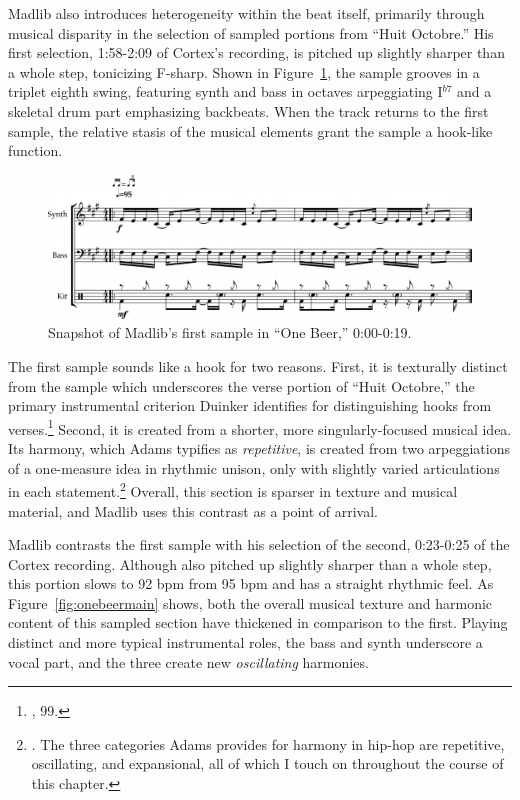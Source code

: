 Madlib also introduces heterogeneity within the beat itself, primarily through musical disparity in the selection of sampled portions from ``Huit Octobre.'' His first selection, 1:58-2:09 of Cortex's recording, is pitched up slightly sharper than a whole step, tonicizing F-sharp. Shown in Figure~\ref{fig:onebeerintro}, the sample grooves in a triplet eighth swing, featuring synth and bass in octaves arpeggiating I$^{b7}$ and a skeletal drum part emphasizing backbeats. When the track returns to the first sample, the relative stasis of the musical elements grant the sample a hook-like function.

    \begin{figure}[ht]
        \centering
        \includegraphics[width=\textwidth]{images/figures/chp 02/000019onebeerintro.pdf}
        \caption{Snapshot of Madlib's first sample in ``One Beer,'' 0:00-0:19.}
        \label{fig:onebeerintro}
    \end{figure}

The first sample sounds like a hook for two reasons. First, it is texturally distinct from the sample which underscores the verse portion of ``Huit Octobre,'' the primary instrumental criterion Duinker identifies for distinguishing hooks from verses.\footnote{\cite{benduinkerSongFormMainstreaming2020}, 99.} Second, it is created from a shorter, more singularly-focused musical idea. Its harmony, which Adams typifies as \emph{repetitive}, is created from two arpeggiations of a one-measure idea in rhythmic unison, only with slightly varied articulations in each statement.\footnote{\cite{kyleadamsHarmonicSyntacticMotivic2020}. The three categories Adams provides for harmony in hip-hop are repetitive, oscillating, and expansional, all of which I touch on throughout the course of this chapter.} Overall, this section is sparser in texture and musical material, and Madlib uses this contrast as a point of arrival.

Madlib contrasts the first sample with his selection of the second, 0:23-0:25 of the Cortex recording. Although also pitched up slightly sharper than a whole step, this portion slows to 92 bpm from 95 bpm and has a straight rhythmic feel. As Figure~\ref{fig:onebeermain} shows, both the overall musical texture and harmonic content of this sampled section have thickened in comparison to the first. Playing distinct and more typical instrumental roles, the bass and synth underscore a vocal part, and the three create new \emph{oscillating} harmonies.

